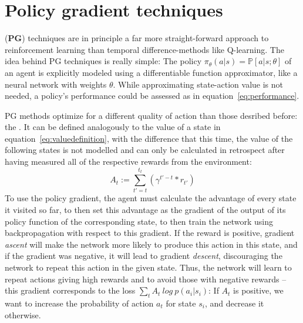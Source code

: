

\section{Policy gradient techniques}

 (\textbf{PG}) techniques are in principle a far more straight-forward approach to reinforcement learning than temporal difference-methods like Q-learning. The idea behind PG techniques is really simple: The policy $\pi_\theta(a|s) = \mathds{P}[a|s;\theta]$ of an agent is explicitly modeled using a differentiable function approximator, like a neural network with weights $\theta$. While approximating state-action value is not needed, a policy's performance could be assessed as in equation~\ref{eq:performance}. 

PG methods optimize for a different quality of action than those desribed before: the . It can be defined analogously to the value of a state in equation~\ref{eq:valuedefinition}, with the difference that this time, the value of the following states is not modelled and can only be calculated in retrospect after having measured all of the respective rewards from the environment:
\begin{equation}
	 A_t := \sum_{t'=t}^{t_t} ( \gamma^{t'-t} * r_{t'} ) 
\end{equation}
To use the policy gradient, the agent must calculate the advantage of every state it visited so far, to then set this advantage as the gradient of the output of its policy function of the corresponding state, to then train the network using backpropagation with respect to this gradient. If the reward is positive, gradient \textit{ascent} will make the network more likely to produce this action in this state, and if the gradient was negative, it will lead to gradient \textit{descent}, discouraging the network to repeat this action in the given state. Thus, the network will learn to repeat actions giving high rewards and to avoid those with negative rewards -- this gradient corresponds to the loss $\sum_t A_t~log~p(a_i|s_i)$: If $A_t$ is positive, we want to increase the probability of action $a_t$ for state $s_i$, and decrease it otherwise.\\

